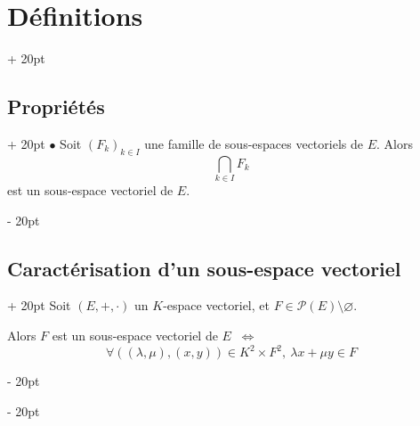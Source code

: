\documentclass[a4paper, 12pt, twoside]{article}
\newcommand{\ssi}{\ \Leftrightarrow \ }
\newcommand{\ind}[1][20pt]{\advance\leftskip + #1}
\newcommand{\deind}[1][20pt]{\advance\leftskip - #1}
\newenvironment{indt}[2][20pt]{#2 \par \ind[#1]}{\par \deind} %
\begin{document}
\begin{indt}{\section{Définitions}}
\begin{indt}{\subsection{Propriétés}}
            $\bullet$ Soit $(F_k)_{k \in I}$ une famille de sous-espaces vectoriels de $E$. Alors
                \[ \bigcap_{k \in I} F_k \]
            est un sous-espace vectoriel de $E$.
        \end{indt}
        
        \vspace{12pt}
        
        \begin{indt}{\subsection{Caractérisation d'un sous-espace vectoriel}}
            Soit $(E, +, \cdot)$ un $K$-espace vectoriel, et $F \in \mathcal P(E) \setminus \varnothing$.
            
            \vspace{6pt}
            
            Alors $F$ est un sous-espace vectoriel de $E$ $\ssi$
                \[ \forall ((\lambda, \mu), (x, y)) \in K^2 \times F^2,\ \lambda x + \mu y \in F \]
        \end{indt}
        
    \end{indt}
    
    \vspace{12pt}
    
\end{document}
